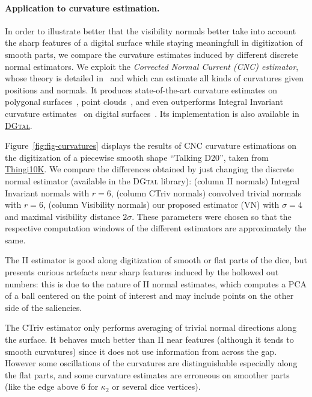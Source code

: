 
\paragraph{Application to curvature estimation.}
In order to illustrate better that the visibility normals better
take into account the sharp features of a digital surface while
staying meaningfull in digitization of smooth parts, we compare
the curvature estimates induced by different discrete normal
estimators. We exploit the \emph{Corrected Normal Current (CNC)
    estimator}, whose theory is detailed in~\cite{lachaud:2022-dcg}
and which can estimate all kinds of curvatures given positions and
normals. It produces state-of-the-art curvature estimates on
polygonal surfaces~\cite{lachaud:2020-cgf}, point clouds~\cite{lachaud:2023-cgf}, and even outperforms Integral Invariant
curvature estimates~\cite{coeurjolly:2014-cviu} on digital
surfaces~\cite{lachaud:2022-dcg}. Its implementation is also
available in    \href{https://dgtal-team.github.io/doc-nightly/moduleCurvatureMeasures.html}{\textsc{DGtal}}.

Figure~\ref{fig:fig-curvatures} displays the results of CNC curvature
estimations on the digitization of a piecewise smooth shape
``Talking D20'', taken from
\href{https://ten-thousand-models.appspot.com/detail.html?file_id=1533028}{Thingi10K}.
We compare the differences obtained by just changing the discrete
normal estimator (available in the \textsc{DGtal} library):
(column II normals) Integral Invariant normals with $r=6$, (column
CTriv normals) convolved trivial normals with $r=6$, (column
Visibility normals) our proposed estimator (VN) with $\sigma=4$ and
maximal visibility distance $2\sigma$. These parameters were
chosen so that the respective computation windows of the different
estimators are approximately the same.

The II estimator is good along digitization of smooth or flat parts of
the dice, but presents curious artefacts near sharp features
induced by the hollowed out numbers: this is due to the nature of
II normal estimates, which computes a PCA of a ball centered on
the point of interest and may include points on the other side of
the saliencies.

The CTriv estimator only performs averaging of trivial normal
directions along the surface. It behaves much better than II near
features (although it tends to smooth curvatures) since it does
not use information from across the gap. However some oscillations
of the curvatures are distinguishable especially along the flat
parts, and some curvature estimates are erroneous on smoother
parts (like the edge above 6 for $\kappa_2$ or several dice
vertices).

